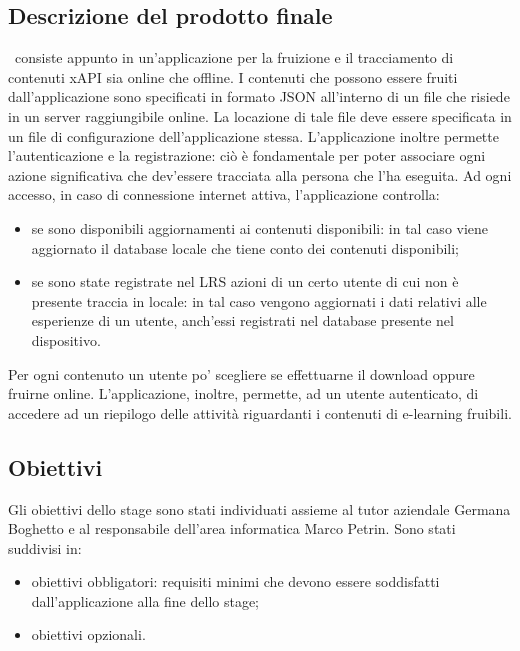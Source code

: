 \documentclass[../Tesi.tex]{subfiles}
\begin{document}
	\subsection{Descrizione del prodotto finale}
	\app\ consiste appunto in un'applicazione per la fruizione e il tracciamento di contenuti xAPI sia online che offline. I contenuti che possono essere fruiti dall’applicazione sono specificati in formato JSON all'interno di un file che risiede in un server raggiungibile online. La locazione di tale file deve essere specificata in un file di configurazione dell'applicazione stessa. L'applicazione inoltre permette l'autenticazione e la registrazione: ciò è fondamentale per poter associare ogni azione significativa che dev'essere tracciata alla persona che l'ha eseguita. Ad ogni accesso, in caso di connessione internet attiva, l'applicazione controlla:
	\begin{itemize}
		\item se sono disponibili aggiornamenti ai contenuti disponibili: in tal caso viene aggiornato il database locale che tiene conto dei contenuti disponibili;
		\item se sono state registrate nel LRS azioni di un certo utente di cui non è presente traccia in locale: in tal caso vengono aggiornati i dati relativi alle esperienze di un utente, anch'essi registrati nel database presente nel dispositivo.
	\end{itemize} 
	Per ogni contenuto un utente po' scegliere se effettuarne il download oppure fruirne online.
	L'applicazione, inoltre, permette, ad un utente autenticato, di accedere ad un riepilogo delle attività riguardanti i contenuti di e-learning fruibili. 

	\subsection{Obiettivi}
		Gli obiettivi dello stage sono stati individuati assieme al tutor aziendale Germana Boghetto e al responsabile dell'area informatica Marco Petrin. Sono stati suddivisi in:
		\begin{itemize}
			\item obiettivi obbligatori: requisiti minimi che devono essere soddisfatti dall'applicazione alla fine dello stage;
			\item obiettivi opzionali.
		\end{itemize}
\end{document}
